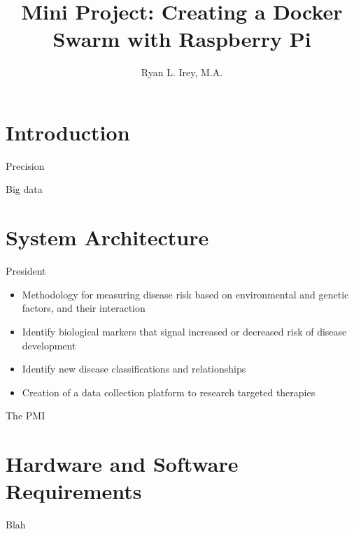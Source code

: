 \title{Mini Project: Creating a Docker Swarm with Raspberry Pi}

\author{Ryan L. Irey, M.A.}

\renewcommand{\shortauthors}{R.L. Irey}

\begin{abstract}

\end{abstract}


\maketitle

\section{Introduction}
\setlength{\parskip}{1em} 
Precision 

\setlength{\parskip}{1em}\noindent 
Big data 

\section{System Architecture}
President\cite{Terry2015}

\begin{itemize}
  \setlength{\parskip}{1em}\item Methodology for measuring disease risk based on environmental and genetic factors, and their interaction
  \setlength{\parskip}{1em}\item Identify biological markers that signal increased or decreased risk of disease development
  \setlength{\parskip}{1em}\item Identify new disease classifications and relationships
  \setlength{\parskip}{1em}\item Creation of a data collection platform to research targeted therapies
\end{itemize}

\setlength{\parskip}{1em}\noindent 
The PMI 
\section{Hardware and Software Requirements}
Blah

